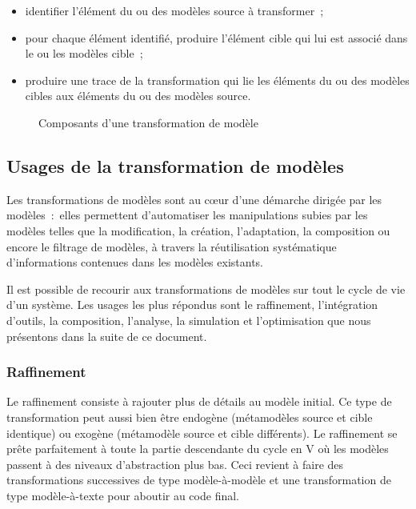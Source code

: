 \begin{itemize}
\item identifier l'élément du ou des modèles source à transformer~;
\item pour chaque élément identifié, produire l'élément cible qui lui est 
associé dans le ou les modèles cible~;
\item produire une trace de la transformation qui lie les éléments du ou des 
modèles cibles aux éléments du ou des modèles source.
\end{itemize}

\begin{figure}[!ht]
    \begin{center}
        
    \end{center}
    \caption{Composants d'une transformation de modèle}
    \label{fig:composantTransfo}
\end{figure}

\subsection{Usages de la transformation de modèles }
Les transformations de modèles sont au cœur d'une démarche dirigée par les 
modèles~:~elles permettent d'automatiser les manipulations subies par les 
modèles telles que la modification, la création, l'adaptation, la composition ou 
encore le filtrage de modèles, à travers la réutilisation systématique 
d'informations contenues dans les modèles existants. 

Il est possible de recourir aux transformations de modèles sur tout le cycle de 
vie d'un système. Les usages les plus répondus sont le raffinement, 
l'intégration d'outils, la composition, l'analyse, la simulation et 
l'optimisation que nous présentons dans la suite de ce document. 


\subsubsection{Raffinement}

Le raffinement consiste à rajouter plus de détails au modèle initial. Ce type de 
transformation peut aussi bien être endogène (métamodèles source et cible 
identique) ou exogène (métamodèle source et cible différents). Le raffinement se 
prête parfaitement à toute la partie descendante du cycle en V où les modèles 
passent à des niveaux d'abstraction plus bas. Ceci revient à faire des 
transformations successives de type modèle-à-modèle et une transformation de 
type modèle-à-texte pour aboutir au code final.

